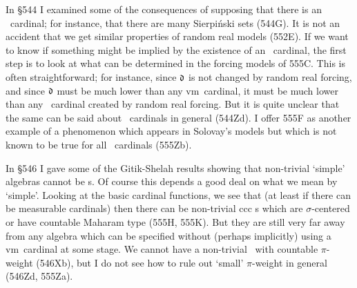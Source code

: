 {In \S544 I examined some of the consequences of supposing that there is an
\am\ cardinal;  for instance, that there are many Sierpi\'nski sets (544G).
It is not an accident that we get similar properties of random real models
(552E).   If we want to know if something might be implied by the
existence of an \am\ cardinal, the first step is to look at what can be
determined in the forcing models of 555C.   This is often straightforward;
for
instance, since $\frak d$ is not changed by random real forcing, and since
$\frak d$ must be much lower than any \2vm\ cardinal, it must be much lower
than any \am\ cardinal created by random real forcing.   But it is quite
unclear that the same can be said about \am\ cardinals in general (544Zd).
I offer 555F as another example of a phenomenon which appears in Solovay's
models but which is not known to be true for all \am\ cardinals (555Zb).

In \S546 I gave some of the Gitik-Shelah results showing that non-trivial
`simple' algebras cannot be \pssqa s.   Of course
this depends a good deal on what
we mean by `simple'.   Looking at the basic cardinal functions, we see that
(at least if there can be measurable cardinals) then there can be
non-trivial ccc \pssqa s which are $\sigma$-centered
or have countable Maharam
type (555H, 555K).   But they are still very far away from any algebra
which can be specified without (perhaps implicitly)
using a \2vm\ cardinal at some stage.
We cannot have a non-trivial \pssqa\ with countable $\pi$-weight (546Xb),
but I do not see how to rule out `small' $\pi$-weight in general (546Zd,
555Za).


}%

\discrpage

